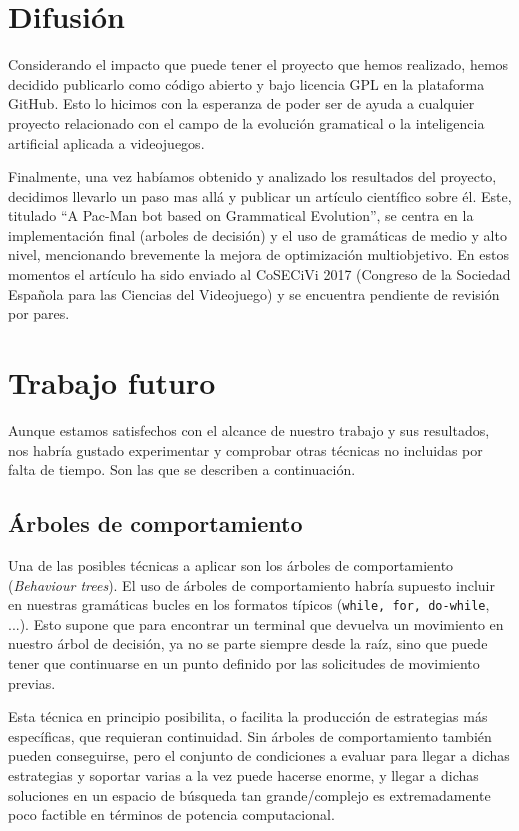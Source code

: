 \section{Difusión} \label{cap:paper}
Considerando el impacto que puede tener el proyecto que hemos realizado, hemos decidido publicarlo \cite{thesisGit} como código abierto y bajo licencia GPL \cite{licenseThesisGit} en la plataforma GitHub. Esto lo hicimos con la esperanza de poder ser de ayuda a cualquier proyecto relacionado con el campo de la evolución gramatical o la inteligencia artificial aplicada a videojuegos.

Finalmente, una vez habíamos obtenido y analizado los resultados del proyecto, decidimos llevarlo un paso mas allá y publicar un artículo científico sobre él. Este, titulado ``A Pac-Man bot based on Grammatical Evolution'', se centra en la implementación final (arboles de decisión) y el uso de gramáticas de medio y alto nivel, mencionando brevemente la mejora de optimización multiobjetivo. En estos momentos el artículo ha sido enviado al CoSECiVi 2017 (Congreso de la Sociedad Española para las Ciencias del Videojuego) y se encuentra pendiente de revisión por pares.

\section{Trabajo futuro}
Aunque estamos satisfechos con el alcance de nuestro trabajo y sus resultados, nos habría gustado experimentar y comprobar otras técnicas no incluidas por falta de tiempo. Son las que se describen a continuación.

\subsection{Árboles de comportamiento}
Una de las posibles técnicas a aplicar son los árboles de comportamiento (\textit{Behaviour trees}). 
El uso de árboles de comportamiento habría supuesto incluir en nuestras gramáticas bucles en los formatos típicos (\texttt{while, for, do-while}, ...). Esto supone que para encontrar un terminal que devuelva un movimiento en nuestro árbol de decisión, ya no se parte siempre desde la raíz, sino que puede tener que continuarse en un punto definido por las solicitudes de movimiento previas.

Esta técnica en principio posibilita, o facilita la producción de estrategias más específicas, que requieran continuidad. Sin árboles de comportamiento también pueden conseguirse, pero el conjunto de condiciones a evaluar para llegar a dichas estrategias y soportar varias a la vez puede hacerse enorme, y llegar a dichas soluciones en un espacio de búsqueda tan grande/complejo es extremadamente poco factible en términos de potencia computacional.

